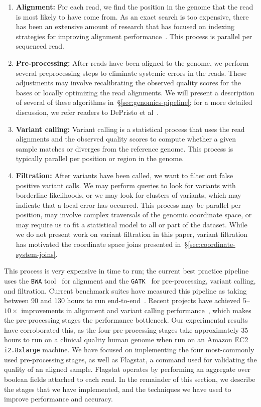 \documentclass{sig-alternate}
\begin{document}
\begin{enumerate}
\item \textbf{Alignment:} For each read, we find the position in the genome that the read is most likely to
have come from. As an exact search is too expensive, there has been an extensive amount of research
that has focused on indexing strategies for improving alignment performance~\cite{li10, li11,
zaharia11}. This process is parallel per sequenced read.
\item \textbf{Pre-processing:} After reads have been aligned to the genome, we perform several
preprocessing steps to eliminate systemic errors in the reads. These adjustments may involve recalibrating the
observed quality scores for the bases or locally optimizing the read alignments. We will present a
description of several of these algorithms in~\S\ref{sec:genomics-pipeline}; for a more detailed
discussion, we refer readers to DePristo et al~\cite{depristo11}.
\item \textbf{Variant calling:} Variant calling is a statistical process that uses the read alignments
and the observed quality scores to compute whether a given sample \linebreak matches or diverges
from the reference genome. This process is typically parallel per position or region in the genome.
\item \textbf{Filtration:} After variants have been called, we want to filter out false positive variant calls.
We may perform queries to look for variants with borderline likelihoods, or we may look for clusters of
variants, which may indicate that a local error has occurred. This process may be parallel per position,
may involve complex traversals of the genomic coordinate space, or may require us to fit a statistical
model to all or part of the dataset. While we do not present work on variant filtration in this paper, variant
filtration has motivated the coordinate space joins presented in~\S\ref{sec:coordinate-system-joins}.
\end{enumerate}

This process is very expensive in time to run; the current best practice pipeline uses the \texttt{BWA} tool~\cite{li10} for
alignment and the \texttt{GATK}~\cite{depristo11, mckenna10} for pre-processing, variant calling, and filtration.
Current benchmark suites have measured this pipeline as taking between 90 and 130 hours to run
end-to-end~\cite{talwalkar14}. Recent projects have achieved 5--$10\times$ improvements in alignment
and variant calling performance~\cite{rimmer14, zaharia11}, which makes the pre-processing stages
the performance bottleneck. Our experimental results have corroborated this, as the four pre-processing stages
take approximately 35 hours to run on a clinical quality human genome when run on an Amazon EC2 \texttt{i2.8xlarge}
machine. We have focused on implementing the four most-commonly used pre-processing stages, as well as
Flagstat, a command used for validating the quality of an aligned sample. Flagstat operates by
performing an aggregate over boolean fields attached to each read. In the remainder of
this section, we describe the stages that we have implemented, and the techniques we have used to improve
performance and accuracy.
\end{document}
